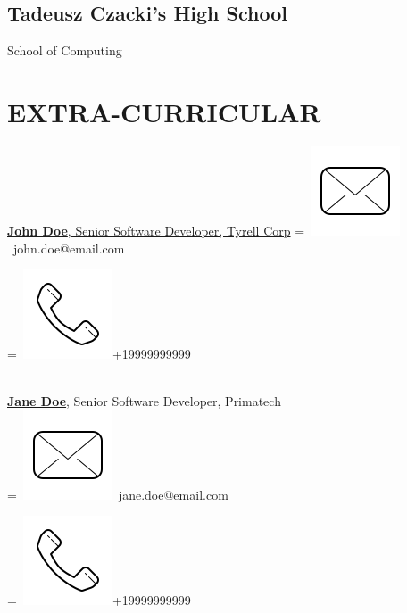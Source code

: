 \documentclass[]{CV}
\begin{document}
\begin{minipage}[t]{0.25\textwidth}
\sectionsep
\subsection{Tadeusz Czacki's High School}
School of Computing \\
\sectionsep

\section{EXTRA-CURRICULAR} 
\href{https://www.linkedin.com/company/john-doe/}{\textbf{John Doe}, Senior Software Developer, Tyrell Corp}
\begingroup
{}=\hbox{
\includegraphics[scale=0.1,trim={0 1cm 0cm 0cm}]{icons/main/mail.png}\hspace{0.3cm} john.doe@email.com
}
\parbox{\wd0}{}
\endgroup
\begingroup
{}=\hbox{
\includegraphics[scale=0.1,trim={0 1.25cm -0.4cm 0cm}]{icons/main/phone.png}\hspace{0.3cm}+19999999999
}
\parbox{\wd0}{}\endgroup
\\
\sectionsep
\href{https://www.linkedin.com/company/john-doe/}{\textbf{Jane Doe}}, Senior Software Developer, Primatech 
\\
\begingroup
{}=\hbox{
\includegraphics[scale=0.1,trim={0 1cm 0cm 0cm}]{icons/main/mail.png}\hspace{0.3cm} jane.doe@email.com
}
\parbox{\wd0}{}
\endgroup
\begingroup
{}=\hbox{
\includegraphics[scale=0.1,trim={0 1.25cm -0.4cm 0cm}]{icons/main/phone.png}\hspace{0.3cm}+19999999999
}
\parbox{\wd0}{}\endgroup
\\


\end{minipage}
\end{document}
